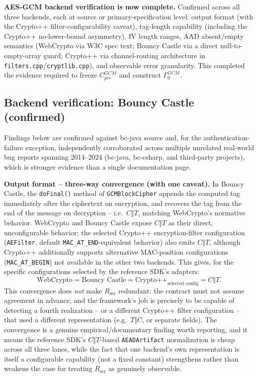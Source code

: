 \documentclass[11pt,a4paper]{article}
\begin{document}
\textbf{AES-GCM backend verification is now complete.} Confirmed across all three backends, each at source or primary-specification level: output format (with the Crypto++ filter-configurability caveat), tag-length capability (including the Crypto++ no-lower-bound asymmetry), IV length ranges, AAD absent/empty semantics (WebCrypto via W3C spec text; Bouncy Castle via a direct null-to-empty-array guard; Crypto++ via channel-routing architecture in \texttt{filters.cpp}/\texttt{cryptlib.cpp}), and observable error granularity. This completed the evidence required to freeze $C_{pre}^{GCM}$ and construct $\Gamma_0^{GCM}$.

\subsection{Backend verification: Bouncy Castle (confirmed)}
Findings below are confirmed against bc-java source and, for the authentication-failure exception, independently corroborated across multiple unrelated real-world bug reports spanning 2014--2024 (bc-java, bc-csharp, and third-party projects), which is stronger evidence than a single documentation page.

\textbf{Output format -- three-way convergence (with one caveat).} In Bouncy Castle, the \texttt{doFinal()} method of \texttt{GCMBlockCipher} appends the computed tag immediately after the ciphertext on encryption, and recovers the tag from the end of the message on decryption -- i.e.\ $C\Vert T$, matching WebCrypto's normative behavior. WebCrypto and Bouncy Castle expose $C\Vert T$ as their direct, unconfigurable behavior; the selected Crypto++ encryption-filter configuration (\texttt{AEFilter}, default \texttt{MAC\_AT\_END}-equivalent behavior) also emits $C\Vert T$, although Crypto++ additionally supports alternative MAC-position configurations (\texttt{MAC\_AT\_BEGIN}) not available in the other two backends. This gives, for the specific configurations selected by the reference SDK's adapters:
\[\text{WebCrypto} = \text{Bouncy Castle} = \text{Crypto++}_{\text{selected config}} = C\Vert T.\]
This convergence does \emph{not} make $R_{\text{ser}}$ redundant: the contract must not assume agreement in advance, and the framework's job is precisely to be capable of detecting a fourth realization -- or a different Crypto++ filter configuration -- that used a different representation (e.g.\ $T\Vert C$, or separate fields). The convergence is a genuine empirical/documentary finding worth reporting, and it means the reference SDK's $C\Vert T$-based \texttt{AEADArtifact} normalization is cheap across all three lanes, while the fact that one backend's own representation is itself a configurable capability (not a fixed constant) strengthens rather than weakens the case for treating $R_{\text{ser}}$ as genuinely observable.
\end{document}
